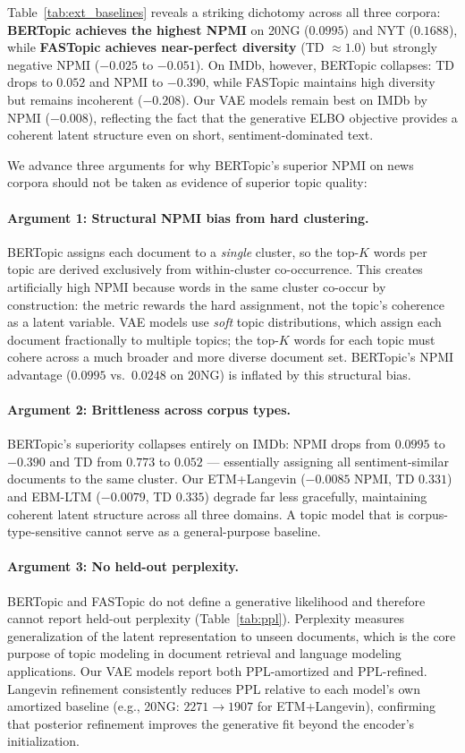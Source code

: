 \documentclass[10pt]{article}
\begin{document}
Table~\ref{tab:ext_baselines} reveals a striking dichotomy across all three corpora:
\textbf{BERTopic achieves the highest NPMI} on 20NG ($0.0995$) and NYT ($0.1688$),
while \textbf{FASTopic achieves near-perfect diversity} (TD $\approx 1.0$) but
strongly negative NPMI ($-0.025$ to $-0.051$).
On IMDb, however, BERTopic collapses: TD drops to $0.052$ and NPMI to $-0.390$,
while FASTopic maintains high diversity but remains incoherent ($-0.208$).
Our VAE models remain best on IMDb by NPMI ($-0.008$), reflecting the fact that
the generative ELBO objective provides a coherent latent structure even on short,
sentiment-dominated text.

We advance three arguments for why BERTopic's superior NPMI on news corpora
should not be taken as evidence of superior topic quality:

\paragraph{Argument 1: Structural NPMI bias from hard clustering.}
BERTopic assigns each document to a \emph{single} cluster, so the top-$K$ words per topic
are derived exclusively from within-cluster co-occurrence. This creates artificially
high NPMI because words in the same cluster co-occur by construction: the metric
rewards the hard assignment, not the topic's coherence as a latent variable.
VAE models use \emph{soft} topic distributions, which assign each document fractionally
to multiple topics; the top-$K$ words for each topic must cohere across a much
broader and more diverse document set. BERTopic's NPMI advantage ($0.0995$ vs.\ $0.0248$
on 20NG) is inflated by this structural bias.

\paragraph{Argument 2: Brittleness across corpus types.}
BERTopic's superiority collapses entirely on IMDb: NPMI drops from $0.0995$ to $-0.390$
and TD from $0.773$ to $0.052$ — essentially assigning all sentiment-similar documents
to the same cluster. Our ETM+Langevin ($-0.0085$ NPMI, TD $0.331$) and EBM-LTM
($-0.0079$, TD $0.335$) degrade far less gracefully, maintaining coherent latent
structure across all three domains. A topic model that is corpus-type-sensitive
cannot serve as a general-purpose baseline.

\paragraph{Argument 3: No held-out perplexity.}
BERTopic and FASTopic do not define a generative likelihood and therefore cannot
report held-out perplexity (Table~\ref{tab:ppl}). Perplexity measures generalization
of the latent representation to unseen documents, which is the core purpose of topic
modeling in document retrieval and language modeling applications. Our VAE models
report both PPL-amortized and PPL-refined. Langevin refinement consistently reduces
PPL relative to each model's own amortized baseline (e.g., 20NG: $2271 \to 1907$ for
ETM+Langevin), confirming that posterior refinement improves the generative fit
beyond the encoder's initialization.
\end{document}
